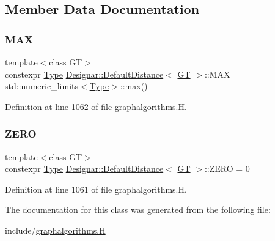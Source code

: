 \subsection{Member Data Documentation}
\mbox{\label{class_designar_1_1_default_distance_af1c417705ee2d66f828c0f872607a7ea}} 
\subsubsection{\texorpdfstring{M\+AX}{MAX}}
{\footnotesize\ttfamily template$<$class GT$>$ \\
constexpr \hyperlink{class_designar_1_1_default_distance_a9317a5edf566779550b96edd532b502b}{Type} \hyperlink{class_designar_1_1_default_distance}{Designar\+::\+Default\+Distance}$<$ \hyperlink{demo-buildgraph_8_c_a3001c40d2c31ca87ed96cd7d1334a55e}{GT} $>$\+::M\+AX = std\+::numeric\+\_\+limits$<$\hyperlink{class_designar_1_1_default_distance_a9317a5edf566779550b96edd532b502b}{Type}$>$\+::max()\hspace{0.3cm}{\ttfamily [static]}}



Definition at line 1062 of file graphalgorithms.\+H.

\mbox{\label{class_designar_1_1_default_distance_abee3d9a2a3f573d6844c0a0fdbd4d7ac}} 
\subsubsection{\texorpdfstring{Z\+E\+RO}{ZERO}}
{\footnotesize\ttfamily template$<$class GT$>$ \\
constexpr \hyperlink{class_designar_1_1_default_distance_a9317a5edf566779550b96edd532b502b}{Type} \hyperlink{class_designar_1_1_default_distance}{Designar\+::\+Default\+Distance}$<$ \hyperlink{demo-buildgraph_8_c_a3001c40d2c31ca87ed96cd7d1334a55e}{GT} $>$\+::Z\+E\+RO = 0\hspace{0.3cm}{\ttfamily [static]}}



Definition at line 1061 of file graphalgorithms.\+H.



The documentation for this class was generated from the following file\+:\begin{DoxyCompactItemize}
\item 
include/\hyperlink{graphalgorithms_8_h}{graphalgorithms.\+H}\end{DoxyCompactItemize}

